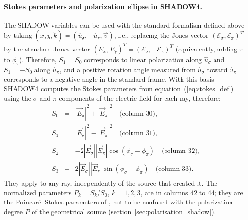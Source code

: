 \documentclass{iucr}
\begin{document}
\paragraph{Stokes parameters and polarization ellipse in SHADOW4.}
The SHADOW variables can be used with the standard formalism defined above by taking $(\check{x},\check{y},\check{k})=(\hat{u}_\sigma, -\hat{u}_\pi, \vec{v})$, i.e., replacing the Jones vector $(\mathcal{E}_\sigma,\mathcal{E}_\pi)^T$ by the standard Jones vector $(E_x,E_y)^T=(\mathcal{E}_\sigma,-\mathcal{E}_\pi)^T$ (equivalently, adding $\pi$ to $\phi_\pi$). Therefore, $S_1=S_0$ corresponds to linear polarization along $\hat{u}_\sigma$ and $S_1=-S_0$ along $\hat{u}_\pi$, and a positive rotation angle measured from $\hat{u}_\sigma$ toward $\hat{u}_\pi$ corresponds to a negative angle in the standard frame.
With this basis, SHADOW4 computes the Stokes parameters from equation~(\ref{eq:stokes_def}) using the $\sigma$ and $\pi$ components of the electric field for each ray, therefore:
\begin{eqnarray}\label{eq:stokes_columns}
    S_0 &=& |\vec{E}_\sigma|^2 + |\vec{E}_\pi|^2 \quad \text{(column 30)}, \nonumber \\
    S_1 &=& |\vec{E}_\sigma|^2 - |\vec{E}_\pi|^2 \quad \text{(column 31)}, \nonumber \\
    S_2 &=& -2|\vec{E}_\sigma||\vec{E}_\pi|\cos(\phi_\sigma-\phi_\pi) \quad \text{(column 32)}, \nonumber \\
    S_3 &=& 2|\vec{E}_\sigma||\vec{E}_\pi|\sin(\phi_\sigma-\phi_\pi) \quad \text{(column 33)}.
\end{eqnarray}
They apply to any ray, independently of the source that created it. The normalized parameters $P_k=S_k/S_0$, $k=1,2,3$, are in columns 42 to 44; they are the Poincar\'e--Stokes parameters of \cite{Detlefs2012}, not to be confused with the polarization degree $P$ of the geometrical source (section~\ref{sec:polarization_shadow}).
\end{document}

